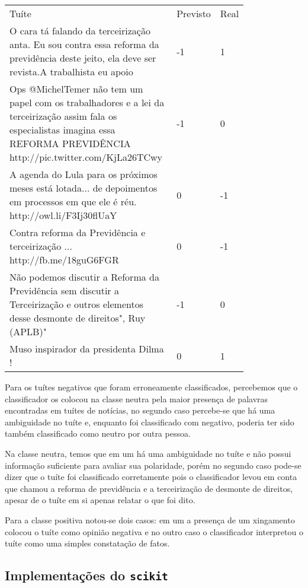 \begin{table}[H]
	\centering	
	\begin{tabular}{| p{0.8\linewidth} | l | l |}
		\hline
		Tuíte & Previsto & Real \\
		O cara tá falando da terceirização anta. Eu sou contra essa reforma da previdência deste jeito, ela deve ser revista.A trabalhista eu apoio & -1 &  1 \\
		\hline
		Ops @MichelTemer não tem um papel com os trabalhadores e a lei da terceirização assim fala os especialistas imagina essa REFORMA PREVIDÊNCIA  http://pic.twitter.com/KjLa26TCwy &  -1 & 0 \\
		\hline
		A agenda do Lula para os próximos meses está lotada... de depoimentos em processos em que ele é réu. http://owl.li/F3Ij30flUaY & 0 & -1 \\
		\hline
		Contra reforma da Previdência e terceirização ... http://fb.me/18guG6FGR & 0 & -1 \\
		\hline
		Não podemos discutir a Reforma da Previdência sem discutir a Terceirização e outros elementos desse desmonte de direitos", Ruy (APLB)" & -1 & 0 \\
		\hline
		Muso inspirador da presidenta Dilma ! & 0 & 1 \\
		\hline
	\end{tabular}
\end{table} 

Para os tuítes negativos que foram erroneamente classificados, percebemos que o classificador os
colocou na classe neutra pela maior presença de palavras encontradas em tuítes de notícias, no segundo
caso percebe-se que há uma ambiguidade no tuíte e, enquanto foi classificado com negativo, poderia
ter sido também classificado como neutro por outra pessoa.

Na classe neutra, temos que em um há uma ambiguidade no tuíte e não possui informação suficiente
para avaliar sua polaridade, porém no segundo caso pode-se dizer que o tuíte foi classificado corretamente
pois o classificador levou em conta que chamou a reforma de previdência e a terceirização de desmonte
de direitos, apesar de o tuíte em si apenas relatar o que foi dito.

Para a classe positiva notou-se dois casos: em um a presença de um xingamento colocou o tuíte como
opinião negativa e no outro caso o classificador interpretou o tuíte como uma simples constatação
de fatos.


\subsection{Implementações do \texttt{scikit}}

